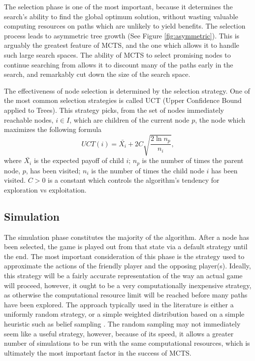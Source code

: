 \documentclass[11pt, letterpaper, twoside]{article}
\begin{document}
The selection phase is one of the most important, because it determines the search's ability to find the global optimum solution, without wasting valuable computing resources on paths which are unlikely to yield benefits. The selection process leads to asymmetric tree growth (See Figure \ref{fig:asymmetric}). This is arguably the greatest feature of MCTS, and the one which allows it to handle such large search spaces. The ability of MCTS to select promising nodes to continue searching from allows it to discount many of the paths early in the search, and remarkably cut down the size of the search space.

The effectiveness of node selection is determined by the selection strategy. One of the most common selection strategies is called UCT \cite{bandit_algorithms} (Upper Confidence Bound applied to Trees). This strategy picks, from the set of nodes immediately reachable nodes, $i \in I$, which are children of the current node $p$, the node which maximizes the following formula
\begin{equation}
	UCT(i)= \bar{X_i} + 2C \sqrt{\frac{2\ln{n_p}}{n_i}},
\end{equation}
	where $\bar{X_i}$ is the expected payoff of child $i$; $n_p$ is the number of times the parent node, $p$, has been visited; $n_i$ is the number of times the child node $i$ has been visited. $C > 0$ is a constant which controls the algorithm's tendency for exploration vs exploitation.

\subsection{Simulation}
The simulation phase constitutes the majority of the algorithm. After a node has been selected, the game is played out from that state via a default strategy until the end. The most important consideration of this phase is the strategy used to approximate the actions of the friendly player and the opposing player(s). Ideally, this strategy will be a fairly accurate representation of the way an actual game will proceed, however, it ought to be a very computationally inexpensive strategy, as otherwise the computational resource limit will be reached before many paths have been explored. The approach typically used in the literature \cite{mcts_settlers} \cite{mmcts} is either a uniformly random strategy, or a simple weighted distribution based on a simple heuristic such as belief sampling \cite{belief_sampling} \cite{large_belief_states}. The random sampling may not immediately seem like a useful strategy, however, because of its speed, it allows a greater number of simulations to be run with the same computational resources, which is ultimately the most important factor in the success of MCTS.
\end{document}
